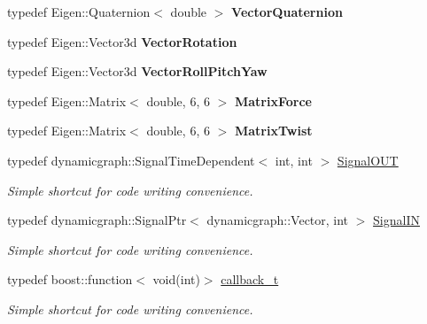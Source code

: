 \begin{DoxyCompactItemize}
typedef Eigen\+::\+Quaternion$<$ double $>$ {\bfseries Vector\+Quaternion}
\item 
\mbox{\label{namespacedynamic__graph_afe3e8341b18b6a3b59f2fa579c2e12c1}} 
typedef Eigen\+::\+Vector3d {\bfseries Vector\+Rotation}
\item 
\mbox{\label{namespacedynamic__graph_af84ad658e1cf7d496958772210dd51b6}} 
typedef Eigen\+::\+Vector3d {\bfseries Vector\+Roll\+Pitch\+Yaw}
\item 
\mbox{\label{namespacedynamic__graph_a43b4e15f6e943f7208372fd22ea108eb}} 
typedef Eigen\+::\+Matrix$<$ double, 6, 6 $>$ {\bfseries Matrix\+Force}
\item 
\mbox{\label{namespacedynamic__graph_a933ba3678a5e0b14430acd27709cdf47}} 
typedef Eigen\+::\+Matrix$<$ double, 6, 6 $>$ {\bfseries Matrix\+Twist}
\item 
\mbox{\label{namespacedynamic__graph_a9d80c350c95e161319d7a6e629ecdc4b}} 
typedef dynamicgraph\+::\+Signal\+Time\+Dependent$<$ int, int $>$ \hyperlink{namespacedynamic__graph_a9d80c350c95e161319d7a6e629ecdc4b}{Signal\+O\+UT}
\begin{DoxyCompactList}\small\item\em Simple shortcut for code writing convenience. \end{DoxyCompactList}\item 
\mbox{\label{namespacedynamic__graph_ae1463c695a6915ea3f9ab4311beb527a}} 
typedef dynamicgraph\+::\+Signal\+Ptr$<$ dynamicgraph\+::\+Vector, int $>$ \hyperlink{namespacedynamic__graph_ae1463c695a6915ea3f9ab4311beb527a}{Signal\+IN}
\begin{DoxyCompactList}\small\item\em Simple shortcut for code writing convenience. \end{DoxyCompactList}\item 
\mbox{\label{namespacedynamic__graph_adf7d40f2a8d1425af80c14f90e58e961}} 
typedef boost\+::function$<$ void(int)$>$ \hyperlink{namespacedynamic__graph_adf7d40f2a8d1425af80c14f90e58e961}{callback\+\_\+t}
\begin{DoxyCompactList}\small\item\em Simple shortcut for code writing convenience. \end{DoxyCompactList}\item 

\end{DoxyCompactItemize}
